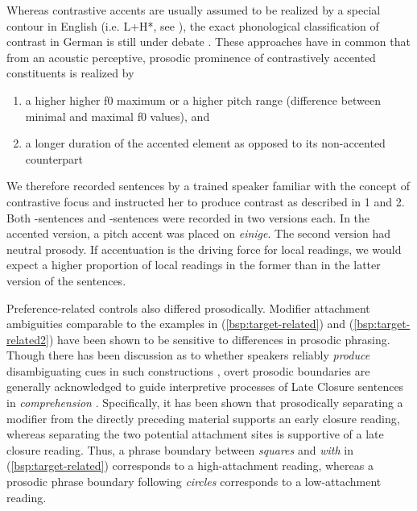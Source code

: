 \documentclass[fleqn,reqno,10pt,draft]{article}
\newcommand{\as}{\acro{as}}
\renewcommand{\es}{\acro{es}}
\begin{document}
Whereas contrastive accents are usually assumed to be realized by a special 
contour in English (i.e. L+H*, see \citet{Pierrehumbert90}), 
the exact phonological classification of contrast in German is still under 
debate \citep[see][]{Uhmann91,Fery93,Grabe98,Toepel06, Sudhoff10}. 
These approaches have in common that from an acoustic perceptive, prosodic 
prominence of contrastively accented constituents is realized by

\begin{enumerate}[1:]
\item a higher higher f0 maximum or a higher pitch range (difference 
between minimal and maximal f0 values), and
\item a longer duration of the accented element as opposed to its 
non-accented counterpart
\end{enumerate}

We therefore recorded sentences by a trained speaker familiar with the 
concept of contrastive focus and instructed her to produce contrast as 
described in 1 and 2. Both \as-sentences and \es-sentences
were recorded in two versions each. In the accented version, a pitch 
accent was placed on {\it einige}. The second version had neutral prosody. 
If accentuation is the driving force for local readings, we would expect 
a higher proportion of local readings in the former than in the latter 
version of the sentences.

Preference-related controls also differed prosodically. Modifier attachment 
ambiguities comparable to the examples in (\ref{bsp:target-related}) and 
(\ref{bsp:target-related2}) have been shown to be sensitive to differences 
in prosodic phrasing. Though there has been discussion as to whether 
speakers reliably \textit{produce} disambiguating cues in such constructions 
\citep[e.g.][]{Allbritton96,Kraljik05, Snedeker03, Schafer00}, overt prosodic 
boundaries are generally acknowledged to guide interpretive processes of Late 
Closure sentences in \textit{comprehension} \citep[e.g.][]{Steinhauer99, Augurzky06}. 
Specifically, it has been shown that prosodically separating a modifier from 
the directly preceding material supports an early closure reading, whereas 
separating the two potential attachment sites is supportive of a late closure 
reading. Thus, a phrase boundary between {\it squares} and {\it with} in
(\ref{bsp:target-related}) corresponds to a high-attachment reading, whereas
a prosodic phrase boundary following {\it circles} corresponds to a low-attachment
reading.  
\end{document}
